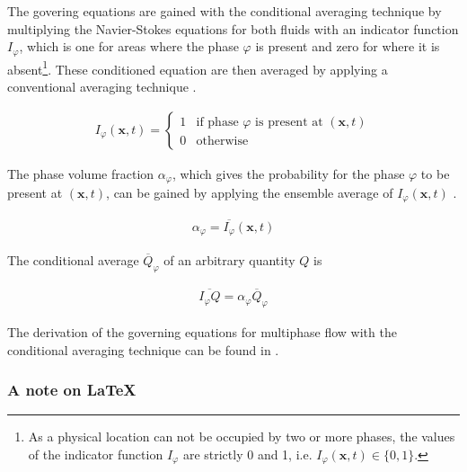 The govering equations are gained with the conditional averaging technique by multiplying 
the Navier-Stokes equations for both fluids with an indicator function $I_\varphi$, which is one 
for areas where the phase $\varphi$ is present and zero for where it is 
absent\footnote{As a physical location can not be occupied by two or more phases, the values 
of the indicator function $I_\varphi$ are strictly 0 and 1, i.e. $I_\varphi(\mathbf{x},t) \in \{0,1\}$.}. 
These conditioned equation are then averaged by applying a conventional averaging technique 
\cite{weller1993}.


\begin{gather}
	I_\varphi(\mathbf{x},t) = \begin{cases}
		1	& \text{if phase $\varphi$ is present at } (\mathbf{x},t) \\
		0	& \text{otherwise}
	\end{cases}
\end{gather}

The phase volume fraction $\alpha_\varphi$, which gives the probability for the phase $\varphi$ 
to be present at $(\mathbf{x},t)$, can be gained by applying the ensemble average of 
$I_\varphi(\mathbf{x},t)$ \cite{openCFD2005}.

\begin{gather}
	\alpha_\varphi = \overbar{I_\varphi}(\mathbf{x},t)
\end{gather}

The conditional average $\overbar{Q}_\varphi$ of an arbitrary quantity $Q$ is 

\begin{gather}
	\overbar{I_\varphi Q} = \alpha_\varphi \overbar{Q}_\varphi
\end{gather}

The derivation of the governing equations for multiphase flow with the conditional averaging 
technique can be found in \cite{marschallPhD,openCFD2005}.


%
%
%
%



\subsubsection*{A note on \LaTeX{}}

